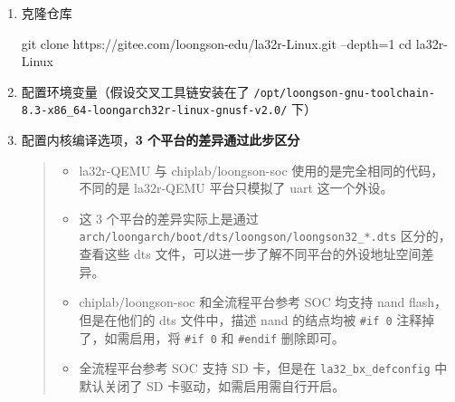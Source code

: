 \begin{enumerate}
\def\labelenumi{\arabic{enumi}.}
\item
  克隆仓库

\begin{CodeBlock}[language=BookShell]
git clone https://gitee.com/loongson-edu/la32r-Linux.git --depth=1
cd la32r-Linux
\end{CodeBlock}
\item
  配置环境变量（假设交叉工具链安装在了 \texttt{/opt/loongson-gnu-toolchain-8.3-x86\_64-loongarch32r-linux-gnusf-v2.0/} 下）

\item
  配置内核编译选项，\textbf{3 个平台的差异通过此步区分}

  \begin{quote}
  \begin{itemize}
  \tightlist
  \item
    la32r-QEMU 与 chiplab/loongson-soc 使用的是完全相同的代码，不同的是 la32r-QEMU 平台只模拟了 uart 这一个外设。
  \item
    这 3 个平台的差异实际上是通过 \texttt{arch/loongarch/boot/dts/loongson/loongson32\_*.dts} 区分的，查看这些 dts 文件，可以进一步了解不同平台的外设地址空间差异。
  \item
    chiplab/loongson-soc 和全流程平台参考 SOC 均支持 nand flash，但是在他们的 dts 文件中，描述 nand 的结点均被 \texttt{\#if\ 0} 注释掉了，如需启用，将 \texttt{\#if\ 0} 和 \texttt{\#endif} 删除即可。
  \item
    全流程平台参考 SOC 支持 SD 卡，但是在 \texttt{la32\_bx\_defconfig} 中默认关闭了 SD 卡驱动，如需启用需自行开启。
  \end{itemize}
  \end{quote}


\end{enumerate}
